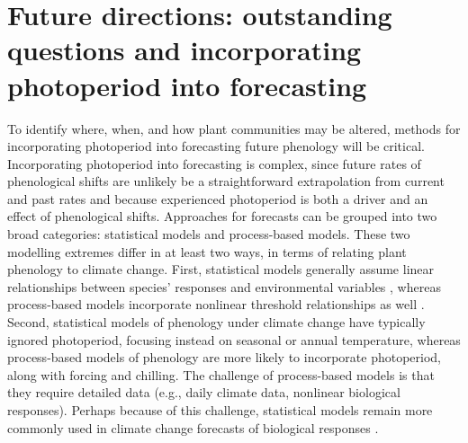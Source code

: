 \documentclass{article}
\begin{document}

\section*{Future directions: outstanding questions and incorporating photoperiod into forecasting}
\par  To identify where, when, and how plant communities may be altered, methods for incorporating photoperiod into forecasting future phenology will be critical. Incorporating photoperiod into forecasting is complex, since future rates of phenological shifts are unlikely be a straightforward extrapolation from current and past rates and because experienced photoperiod is both a driver and an effect of phenological shifts. Approaches for forecasts can be grouped into two broad categories: statistical models and process-based models. These two modelling extremes differ in at least two ways, in terms of relating plant phenology to climate change. First, statistical models generally assume linear relationships between species' responses and environmental variables \citep[e.g., OTHER EXAMPLES][]{flynn2018}, whereas process-based models incorporate nonlinear threshold relationships as well \citep[e.g.][]{chuine2001,morin2009}. Second, statistical models of phenology under climate change have typically ignored photoperiod, focusing instead on seasonal or annual temperature, %
whereas process-based models of phenology are more likely to incorporate photoperiod, along with forcing and chilling. The challenge of process-based models is that they require detailed data (e.g., daily climate data, nonlinear biological responses). Perhaps because of this challenge, statistical models remain more commonly used in climate change forecasts of biological responses \citep[e.g.,][]{Basler:2012}.%
\end{document}
